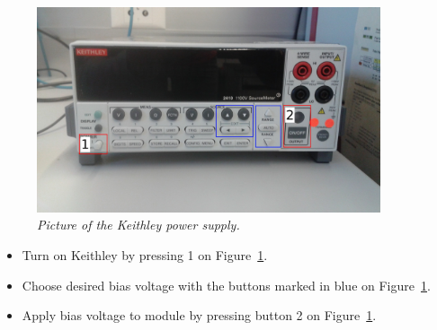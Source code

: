\documentclass[a4paper,12pt,twoside]{article}
\begin{document}
\begin{figure} [h!] \centering 
\includegraphics[width=0.9\textwidth, angle=0] {./Figures/Keithley.jpg}
\caption{\em  \label{Keithley}
Picture of the Keithley power supply.}
\end{figure}
\begin{itemize}
\item Turn on Keithley by pressing 1 on Figure~\ref{Keithley}.
\item Choose desired bias voltage with the buttons marked in blue on Figure~\ref{Keithley}.
\item Apply bias voltage to module by pressing button 2 on Figure~\ref{Keithley}.
\end{itemize}
\end{document}
